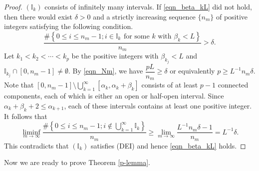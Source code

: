\documentclass{amsart}
\theoremstyle{definition}
\numberwithin{equation}{section}
\numberwithin{figure}{section}
\begin{document}
\begin{proof}
 $({\mathbb{I}}_k)$ consists of infinitely many intervals. 
If \eqref{eqn_beta_kL} did not hold, then there would exist $\delta>0$ and a strictly increasing sequence $\{n_m\}$ 
of positive integers satisfying the following condition.
\begin{equation}\label{eqn_Nm}
\frac{\#\left\{0\leq i\leq n_m-1; i\in {\mathbb{I}}_k\,\ \text{for some $k$ with $\beta_k< L$}\right\}}{n_m}>\delta.
\end{equation}
Let $k_1<k_2<\cdots<k_p$ be the positive integers with $\beta_{k_j}<L$ and ${\mathbb{I}}_{k_j}\cap [0,n_m-1]\neq \emptyset$.
By \eqref{eqn_Nm}, we have $\dfrac{pL}{n_m}\geq \delta$ or equivalently $p\geq L^{-1}n_m\delta$.
Note that $[0,n_m-1]\setminus \bigcup_{k=1}^\infty[\alpha_k,\alpha_k+\beta_k]$ consists of at least $p-1$ connected components, each of which is 
either an open or half-open interval.
Since $\alpha_k+\beta_k+2\leq \alpha_{k+1}$, each of these intervals contains at least one positive integer.
It follows that 
$$
\liminf_{m\rightarrow \infty}
\frac{\#\left\{0\leq i\leq n_m-1; i\not\in \bigcup_{k=1}^\infty{\mathbb{I}}_k\right\}}{n_m}
\geq 
\lim_{m\rightarrow \infty}\frac{L^{-1}n_m\delta-1}{n_m}=L^{-1}\delta.$$
This contradicts that $({\mathbb{I}}_k)$ satisfies (DEI) and hence \eqref{eqn_beta_kL} holds.
\end{proof}

Now we are ready to prove Theorem \ref{p-lemma}.
\end{document}
